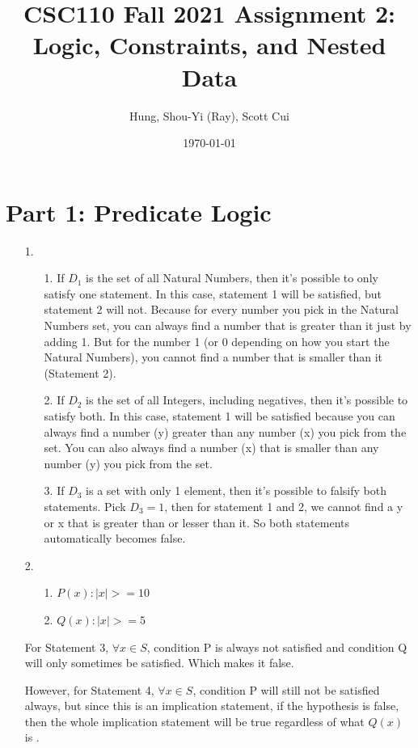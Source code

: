 \documentclass[fontsize=11pt]{article}
\title{CSC110 Fall 2021 Assignment 2: Logic, Constraints, and Nested Data}
\author{Hung, Shou-Yi (Ray), Scott Cui}
\date{\today}
\begin{document}
\maketitle

\section*{Part 1: Predicate Logic}

\begin{enumerate}

    \item[1.]
        \begin{enumerate}
            \item[1.] If $D_1$ is the set of all Natural Numbers, then it's possible to only satisfy one statement. In this case, statement 1 will be satisfied, but statement 2 will not. Because for every number you pick in the Natural Numbers set, you can always find a number that is greater than it just by adding 1. But for the number 1 (or 0 depending on how you start the Natural Numbers), you cannot find a number that is smaller than it (Statement 2).
            \item[2.] If $D_2$ is the set of all Integers, including negatives, then it's possible to satisfy both. In this case, statement 1 will be satisfied because you can always find a number (y) greater than any number (x) you pick from the set. You can also always find a number (x) that is smaller than any number (y) you pick from the set.
            \item[3.] If $D_3$ is a set with only 1 element, then it's possible to falsify both statements. Pick $D_3 = {1}$, then for statement 1 and 2, we cannot find a y or x that is greater than or lesser than it. So both statements automatically becomes false.
        \end{enumerate}

    \item[2.]
        \begin{enumerate}
            \item[1.] $P(x): |x| >= 10$
            \item[2.] $Q(x): |x| >= 5$
        \end{enumerate}
        For Statement 3, $\forall x \in S$, condition P is always not satisfied and condition Q will only sometimes be satisfied. Which makes it false.

        However, for Statement 4, $\forall x \in S$, condition P will still not be satisfied always, but since this is an implication statement, if the hypothesis is false, then the whole implication statement will be true regardless of what $Q(x)$ is .


\end{enumerate}
\end{document}
